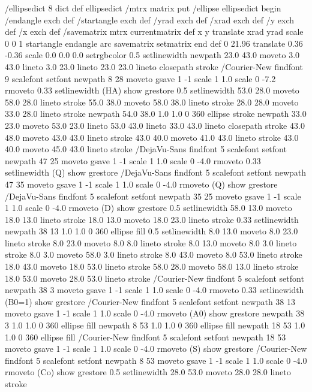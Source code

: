 /ellipsedict 8 dict def
ellipsedict /mtrx matrix put
/ellipse
   { ellipsedict begin
     /endangle exch def
     /startangle exch def
     /yrad exch def
     /xrad exch def
     /y exch def
     /x exch def
     /savematrix mtrx currentmatrix def
     x y translate
     xrad yrad scale
     0 0 1 startangle endangle arc
     savematrix setmatrix
     end
   } def
0 21.96 translate
0.36 -0.36 scale
  0.0 0.0 0.0 setrgbcolor
  0.5 setlinewidth
newpath
23.0 43.0 moveto
3.0 43.0 lineto
3.0 23.0 lineto
23.0 23.0 lineto
closepath
stroke
/Courier-New findfont
9 scalefont
setfont
newpath
8 28 moveto
gsave
  1 -1 scale
  1 1.0 scale
  0 -7.2 rmoveto
  0.33 setlinewidth
  (HA) show
grestore
  0.5 setlinewidth
53.0 28.0 moveto 58.0 28.0 lineto stroke
55.0 38.0 moveto 58.0 38.0 lineto stroke
28.0 28.0 moveto 33.0 28.0 lineto stroke
newpath
54.0 38.0 1.0 1.0 0 360 ellipse
stroke
newpath
33.0 23.0 moveto
53.0 23.0 lineto
53.0 43.0 lineto
33.0 43.0 lineto
closepath
stroke
43.0 48.0 moveto 43.0 43.0 lineto stroke
43.0 40.0 moveto 41.0 43.0 lineto stroke
43.0 40.0 moveto 45.0 43.0 lineto stroke
/DejaVu-Sans findfont
5 scalefont
setfont
newpath
47 25 moveto
gsave
  1 -1 scale
  1 1.0 scale
  0 -4.0 rmoveto
  0.33 setlinewidth
  (Q) show
grestore
/DejaVu-Sans findfont
5 scalefont
setfont
newpath
47 35 moveto
gsave
  1 -1 scale
  1 1.0 scale
  0 -4.0 rmoveto
  (Q) show
grestore
/DejaVu-Sans findfont
5 scalefont
setfont
newpath
35 25 moveto
gsave
  1 -1 scale
  1 1.0 scale
  0 -4.0 rmoveto
  (D) show
grestore
  0.5 setlinewidth
58.0 13.0 moveto 18.0 13.0 lineto stroke
18.0 13.0 moveto 18.0 23.0 lineto stroke
  0.33 setlinewidth
newpath
38 13 1.0 1.0 0 360 ellipse
fill
  0.5 setlinewidth
8.0 13.0 moveto 8.0 23.0 lineto stroke
8.0 23.0 moveto 8.0 8.0 lineto stroke
8.0 13.0 moveto 8.0 3.0 lineto stroke
8.0 3.0 moveto 58.0 3.0 lineto stroke
8.0 43.0 moveto 8.0 53.0 lineto stroke
18.0 43.0 moveto 18.0 53.0 lineto stroke
58.0 28.0 moveto 58.0 13.0 lineto stroke
18.0 53.0 moveto 28.0 53.0 lineto stroke
/Courier-New findfont
5 scalefont
setfont
newpath
38 3 moveto
gsave
  1 -1 scale
  1 1.0 scale
  0 -4.0 rmoveto
  0.33 setlinewidth
  (B0=1) show
grestore
/Courier-New findfont
5 scalefont
setfont
newpath
38 13 moveto
gsave
  1 -1 scale
  1 1.0 scale
  0 -4.0 rmoveto
  (A0) show
grestore
newpath
38 3 1.0 1.0 0 360 ellipse
fill
newpath
8 53 1.0 1.0 0 360 ellipse
fill
newpath
18 53 1.0 1.0 0 360 ellipse
fill
/Courier-New findfont
5 scalefont
setfont
newpath
18 53 moveto
gsave
  1 -1 scale
  1 1.0 scale
  0 -4.0 rmoveto
  (S) show
grestore
/Courier-New findfont
5 scalefont
setfont
newpath
8 53 moveto
gsave
  1 -1 scale
  1 1.0 scale
  0 -4.0 rmoveto
  (Co) show
grestore
  0.5 setlinewidth
28.0 53.0 moveto 28.0 28.0 lineto stroke
